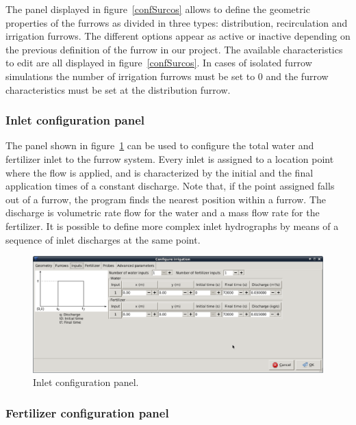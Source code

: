 \documentclass[review,authoryear]{elsarticle}
\begin{document}
The panel displayed in figure~\ref{confSurcos} allows to define the geometric
properties of the furrows as divided in three types: distribution, recirculation
and irrigation furrows. The different options appear as active or inactive
depending on the previous definition of the furrow in our project. The available
characteristics to edit are all displayed in figure~\ref{confSurcos}. In cases
of isolated furrow simulations the number of irrigation furrows must be set to 0
and the furrow characteristics must be set at the distribution furrow.

\subsubsection{Inlet configuration panel}

The panel shown in figure~\ref{input} can be used to configure the total water
and fertilizer inlet to the furrow system. Every inlet is assigned to a location
point where the flow is applied, and is characterized by the initial and the
final application times of a constant discharge. Note that, if the point
assigned falls out of a furrow, the program finds the nearest position within a
furrow. The discharge is volumetric rate flow for the water and a mass flow rate
for the fertilizer. It is possible to define more complex inlet hydrographs by
means of a sequence of inlet discharges at the same point. 


\begin{figure}[!ht]
\begin{center}
\includegraphics[width=1125\UNIT]{confInputEN.eps}
\caption{Inlet configuration panel.}\label{input}
\end{center}
\end{figure}

\subsubsection{Fertilizer configuration panel}
\end{document}
